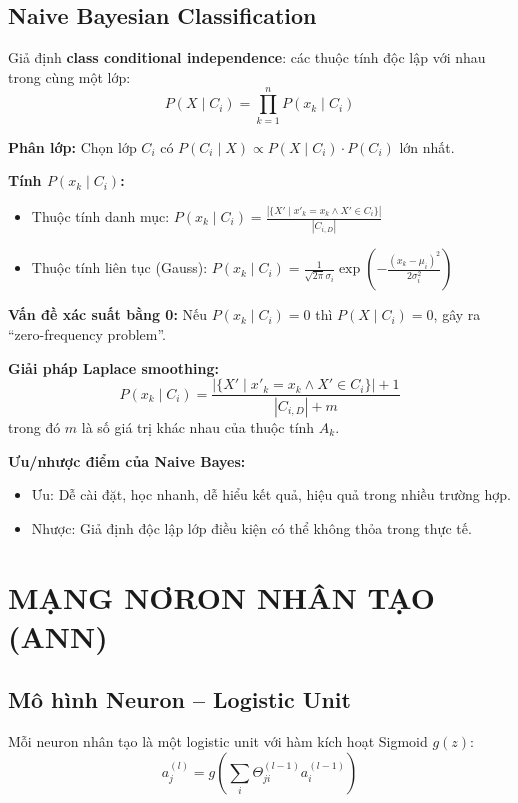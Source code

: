\documentclass[10pt]{article}
\begin{document}
\subsection{Naive Bayesian Classification}

Giả định \textbf{class conditional independence}: các thuộc tính độc lập với nhau trong cùng một lớp:
\[
P(X \mid C_i) = \prod_{k=1}^{n} P(x_k \mid C_i)
\]

\textbf{Phân lớp:} Chọn lớp $C_i$ có $P(C_i \mid X) \propto P(X \mid C_i) \cdot P(C_i)$ lớn nhất.

\textbf{Tính $P(x_k \mid C_i)$:}
\begin{itemize}
    \item Thuộc tính danh mục: $P(x_k \mid C_i) = \frac{|\{X' \mid x'_k = x_k \wedge X' \in C_i\}|}{|C_{i,D}|}$
    \item Thuộc tính liên tục (Gauss): $P(x_k \mid C_i) = \frac{1}{\sqrt{2\pi}\sigma_i} \exp\left(-\frac{(x_k - \mu_i)^2}{2\sigma_i^2}\right)$
\end{itemize}

\textbf{Vấn đề xác suất bằng 0:} Nếu $P(x_k \mid C_i) = 0$ thì $P(X \mid C_i) = 0$, gây ra ``zero-frequency problem''.

\textbf{Giải pháp Laplace smoothing:}
\[
P(x_k \mid C_i) = \frac{|\{X' \mid x'_k = x_k \wedge X' \in C_i\}| + 1}{|C_{i,D}| + m}
\]
trong đó $m$ là số giá trị khác nhau của thuộc tính $A_k$.

\textbf{Ưu/nhược điểm của Naive Bayes:}
\begin{itemize}
    \item Ưu: Dễ cài đặt, học nhanh, dễ hiểu kết quả, hiệu quả trong nhiều trường hợp.
    \item Nhược: Giả định độc lập lớp điều kiện có thể không thỏa trong thực tế.
\end{itemize}

\section{MẠNG NƠRON NHÂN TẠO (ANN)}

\subsection{Mô hình Neuron -- Logistic Unit}

Mỗi neuron nhân tạo là một logistic unit với hàm kích hoạt Sigmoid $g(z)$:
\[
a^{(l)}_j = g\left(\sum_i \Theta^{(l-1)}_{ji} a^{(l-1)}_i\right)
\]
\end{document}
